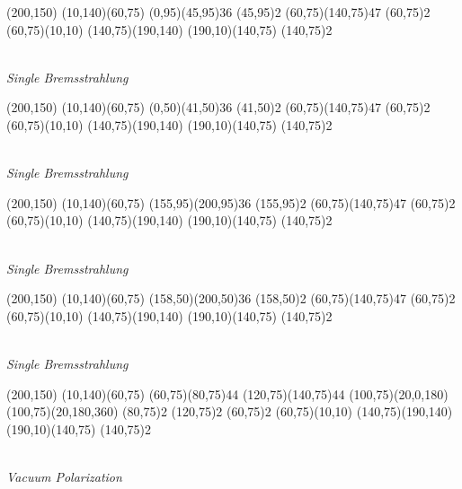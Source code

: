 \documentclass{article}
\begin{document}
	
	
\begin{center}
	\begin{axopicture}(200,150)
		\Line[arrow](10,140)(60,75)
		\Photon(0,95)(45,95){3}{6}
		\Vertex(45,95){2}
		\Photon(60,75)(140,75){4}{7}
		\Vertex(60,75){2}
		\Line[arrow](60,75)(10,10)
		\Line[arrow](140,75)(190,140)
		\Line[arrow](190,10)(140,75)
		\Vertex(140,75){2}
	\end{axopicture}
\\ {\sl Single Bremsstrahlung}
\end{center}

\begin{center}
	\begin{axopicture}(200,150)
		\Line[arrow](10,140)(60,75)
		\Photon(0,50)(41,50){3}{6}
		\Vertex(41,50){2}
		\Photon(60,75)(140,75){4}{7}
		\Vertex(60,75){2}
		\Line[arrow](60,75)(10,10)
		\Line[arrow](140,75)(190,140)
		\Line[arrow](190,10)(140,75)
		\Vertex(140,75){2}
	\end{axopicture}
\\ {\sl Single Bremsstrahlung}
\end{center}

\begin{center}
	\begin{axopicture}(200,150)
		\Line[arrow](10,140)(60,75)
		\Photon(155,95)(200,95){3}{6}
		\Vertex(155,95){2}
		\Photon(60,75)(140,75){4}{7}
		\Vertex(60,75){2}
		\Line[arrow](60,75)(10,10)
		\Line[arrow](140,75)(190,140)
		\Line[arrow](190,10)(140,75)
		\Vertex(140,75){2}
	\end{axopicture}
\\ {\sl Single Bremsstrahlung}
\end{center}

\begin{center}
	\begin{axopicture}(200,150)
		\Line[arrow](10,140)(60,75)
		\Photon(158,50)(200,50){3}{6}
		\Vertex(158,50){2}
		\Photon(60,75)(140,75){4}{7}
		\Vertex(60,75){2}
		\Line[arrow](60,75)(10,10)
		\Line[arrow](140,75)(190,140)
		\Line[arrow](190,10)(140,75)
		\Vertex(140,75){2}
	\end{axopicture}
\\ {\sl Single Bremsstrahlung}
\end{center}


\begin{center}
	\begin{axopicture}(200,150)
		\Line[arrow](10,140)(60,75)
		\Photon(60,75)(80,75){4}{4}
		\Photon(120,75)(140,75){4}{4}
		\Arc[arrow](100,75)(20,0,180)
		\Arc[arrow](100,75)(20,180,360)
		\Vertex(80,75){2}
		\Vertex(120,75){2}
		\Vertex(60,75){2}
		\Line[arrow](60,75)(10,10)
		\Line[arrow](140,75)(190,140)
		\Line[arrow](190,10)(140,75)
		\Vertex(140,75){2}
	\end{axopicture}
	\\ {\sl Vacuum Polarization}
\end{center}
\end{document}
